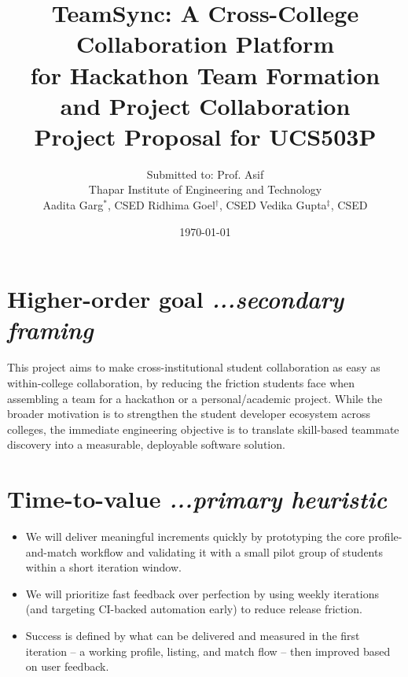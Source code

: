 \documentclass[11pt]{article}
\title{\textbf{TeamSync: A Cross-College Collaboration Platform \\ for Hackathon Team Formation and Project Collaboration}\\[4pt]
\large Project Proposal for UCS503P}
\author{
Submitted to: Prof. Asif \\
Thapar Institute of Engineering and Technology \\[10pt]
Aadita Garg$^{*}$, CSED \quad Ridhima Goel$^{\dagger}$, CSED \quad Vedika Gupta$^{\ddagger}$, CSED
}
\date{\today}
\begin{document}
\maketitle
\let\thefootnote\relax{}

\section{Higher-order goal \textit{...secondary framing}}
This project aims to make cross-institutional student collaboration as easy as within-college
collaboration, by reducing the friction students face when assembling a team for a hackathon
or a personal/academic project. While the broader motivation is to strengthen the student
developer ecosystem across colleges, the immediate engineering objective is to translate
skill-based teammate discovery into a measurable, deployable software solution.

\section{Time-to-value \textit{...primary heuristic}}
\begin{itemize}[leftmargin=*]
  \item We will deliver meaningful increments quickly by prototyping the core profile-and-match
  workflow and validating it with a small pilot group of students within a short iteration window.
  \item We will prioritize fast feedback over perfection by using weekly iterations (and targeting
  CI-backed automation early) to reduce release friction.
  \item Success is defined by what can be delivered and measured in the first iteration -- a
  working profile, listing, and match flow -- then improved based on user feedback.
\end{itemize}
\end{document}
